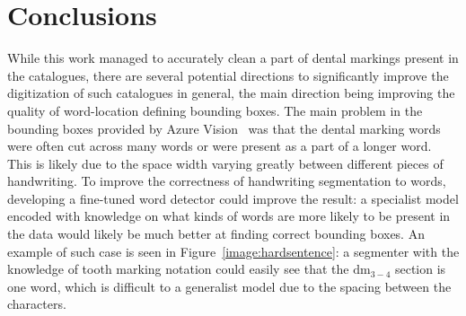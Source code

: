\documentclass{article}
\begin{document}
\section{Conclusions}

While this work managed to accurately clean a part of dental markings present in the catalogues, 
there are several potential directions to significantly improve the digitization of such catalogues in general, the main direction 
being improving the quality of word-location defining bounding boxes. The main problem in the bounding boxes provided 
by Azure Vision~\cite{azurevision} was that the dental marking words were often cut across many words or were present 
as a part of a longer word. This is likely due to the space width varying greatly between different pieces of 
handwriting. To improve the correctness of handwriting segmentation to words, developing a fine-tuned word detector 
could improve the result: a specialist model encoded with knowledge on what kinds of words are more likely to be 
present in the data would likely be much better at finding correct bounding boxes. An example of 
such case is seen in Figure~\ref{image:hardsentence}: a segmenter with the knowledge of tooth marking notation could 
easily see that the $\text{dm}_{3-4}$ section is one word, which is difficult to a generalist model 
due to the spacing between the characters.
\end{document}
